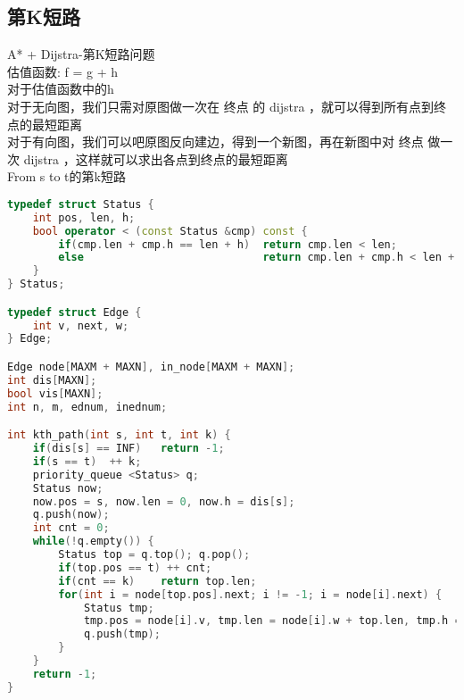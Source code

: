 \subsection{第K短路}
A* + Dijstra-第K短路问题\\
估值函数: f = g + h\\
对于估值函数中的h\\
对于无向图，我们只需对原图做一次在 终点 的 dijstra ，就可以得到所有点到终点的最短距离\\
对于有向图，我们可以吧原图反向建边，得到一个新图，再在新图中对 终点 做一次 dijstra ，这样就可以求出各点到终点的最短距离\\
From s to t的第k短路\\
    \begin{lstlisting}[language=c++]
typedef struct Status {
    int pos, len, h;
    bool operator < (const Status &cmp) const {
        if(cmp.len + cmp.h == len + h)  return cmp.len < len;
        else                            return cmp.len + cmp.h < len + h;
    }
} Status;

typedef struct Edge {
    int v, next, w;
} Edge;

Edge node[MAXM + MAXN], in_node[MAXM + MAXN];
int dis[MAXN];
bool vis[MAXN];
int n, m, ednum, inednum;

int kth_path(int s, int t, int k) {
    if(dis[s] == INF)   return -1;
    if(s == t)  ++ k;
    priority_queue <Status> q;
    Status now;
    now.pos = s, now.len = 0, now.h = dis[s];
    q.push(now);
    int cnt = 0;
    while(!q.empty()) {
        Status top = q.top(); q.pop();
        if(top.pos == t) ++ cnt;
        if(cnt == k)    return top.len;
        for(int i = node[top.pos].next; i != -1; i = node[i].next) {
            Status tmp;
            tmp.pos = node[i].v, tmp.len = node[i].w + top.len, tmp.h = dis[node[i].v];
            q.push(tmp);
        }
    }
    return -1;
}
    \end{lstlisting}
